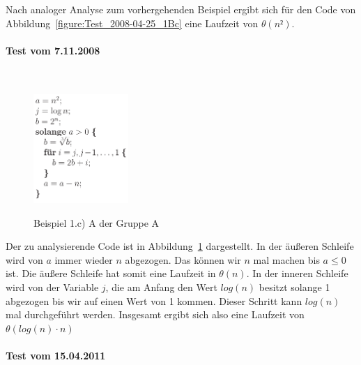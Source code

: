 \documentclass[a4paper, 12pt]{article}
\begin{document}
Nach analoger Analyse zum vorhergehenden Beispiel ergibt sich für den Code von Abbildung~\ref{figure:Test_2008-04-25_1Bc} eine Laufzeit von $θ\left(n²\right)$.

\paragraph{Test vom 7.11.2008}~\\

\begin{figure}[htbp]
	\caption{Beispiel 1.c) A der Gruppe A}
	\vskip 0.2cm
	\centering
	\includegraphics[width=0.32\textwidth]{Figures/Test_2008-11-07_1AcA}
	\label{figure:Test_2008-11-07_1AcA}
\end{figure}

Der zu analysierende Code ist in Abbildung~\ref{figure:Test_2008-11-07_1AcA} dargestellt. In der äußeren Schleife wird von $a$ immer wieder $n$ abgezogen. Das können wir $n$ mal machen bis $a≤0$ ist. Die äußere Schleife hat somit eine Laufzeit in $θ\left(n\right)$. In der inneren Schleife wird von der Variable $j$, die am Anfang den Wert $log\left(n\right)$ besitzt solange 1 abgezogen bis wir auf einen Wert von 1 kommen. Dieser Schritt kann $log\left(n\right)$ mal durchgeführt werden. Insgesamt ergibt sich also eine Laufzeit von $θ\left(log\left(n\right)⋅ n\right)$

\paragraph{Test vom 15.04.2011}~\\
\end{document}
